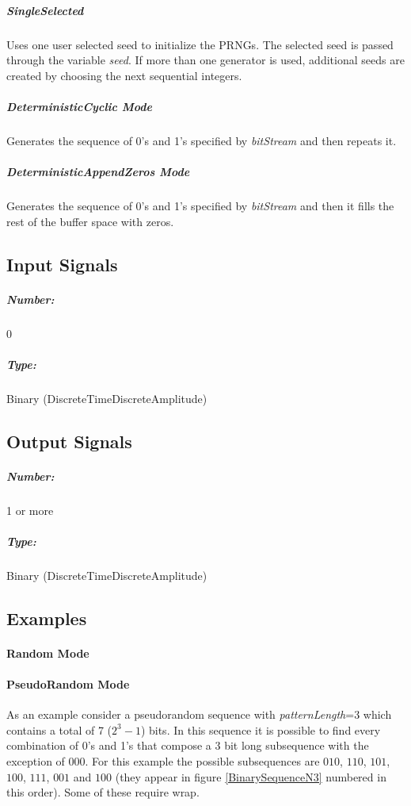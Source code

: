 \subparagraph*{SingleSelected}
Uses one user selected seed to initialize the PRNGs. The selected seed is passed through the variable \textit{seed}. If more than one generator is used, additional seeds are created by choosing the next sequential integers.


\subparagraph*{DeterministicCyclic Mode}
Generates the sequence of 0's and 1's specified by \textit{bitStream} and then repeats it.

\subparagraph*{DeterministicAppendZeros Mode}
Generates the sequence of 0's and 1's specified by \textit{bitStream} and then it fills the rest of the buffer space with zeros.

\subsection*{Input Signals}


\subparagraph*{Number:} 0

\subparagraph*{Type:} Binary (DiscreteTimeDiscreteAmplitude)

\subsection*{Output Signals}

\subparagraph*{Number:} 1 or more

\subparagraph*{Type:} Binary (DiscreteTimeDiscreteAmplitude)

\subsection*{Examples}

\paragraph*{Random Mode}

\paragraph*{PseudoRandom Mode}
As an example consider a pseudorandom sequence with \textit{patternLength}=3 which contains a total of 7 ($2^3-1$) bits. In this sequence it is possible to find every combination of 0's and 1's that compose a 3 bit long subsequence with the exception of $000$. For this example the possible subsequences are $010$, $110$, $101$, $100$, $111$, $001$ and $100$ (they appear in figure \ref{BinarySequenceN3} numbered in this order). Some of these require wrap.

